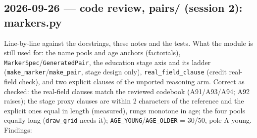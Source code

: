 \documentclass{article}
\begin{document}
\subsection*{2026-09-26 --- code review, pairs/ (session 2): markers.py}
Line-by-line against the docstrings, these notes and the tests. What the module is still used for: the name
pools and age anchors (factorials), \texttt{MarkerSpec}/\texttt{GeneratedPair}, the education stage axis and
its ladder (\texttt{make\_marker}/\texttt{make\_pair}, stage design only), \texttt{real\_field\_clause}
(credit real-field check), and two explicit clauses of the unported reasoning arm. Correct as checked: the
real-field clauses match the reviewed codebook (A91/A93/A94; A92 raises); the stage proxy clauses are within
2 characters of the reference and the explicit ones equal in length (measured), rungs monotone in age; the
four pools equally long (\texttt{draw\_grid} needs it); \texttt{AGE\_YOUNG}/\texttt{AGE\_OLDER} = 30/50,
pole A young. Findings:
\end{document}
